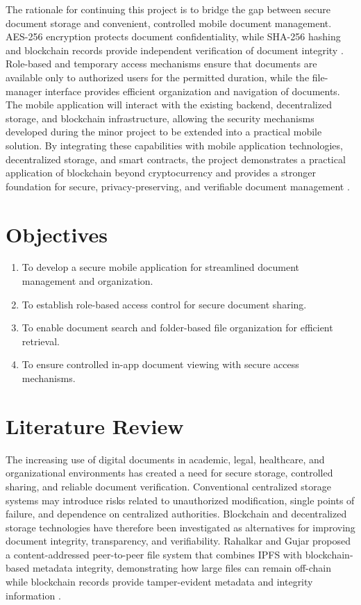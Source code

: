 \documentclass[12pt]{article}
\begin{document}
The rationale for continuing this project is to bridge the gap between secure document storage and convenient, controlled mobile document management. AES-256 encryption protects document confidentiality, while SHA-256 hashing and blockchain records provide independent verification of document integrity \cite{nist197}. Role-based and temporary access mechanisms ensure that documents are available only to authorized users for the permitted duration, while the file-manager interface provides efficient organization and navigation of documents. The mobile application will interact with the existing backend, decentralized storage, and blockchain infrastructure, allowing the security mechanisms developed during the minor project to be extended into a practical mobile solution. By integrating these capabilities with mobile application technologies, decentralized storage, and smart contracts, the project demonstrates a practical application of blockchain beyond cryptocurrency and provides a stronger foundation for secure, privacy-preserving, and verifiable document management \cite{szabo1997}.


\newpage
\section{Objectives}

\begin{enumerate}
    \item To develop a secure mobile application for streamlined document management and organization.
    
    \item To establish role-based access control for secure document sharing.
    
    \item To enable document search and folder-based file organization for efficient retrieval.
    
    \item To ensure controlled in-app document viewing with secure access mechanisms.
\end{enumerate}




\newpage
\section{Literature Review}

The increasing use of digital documents in academic, legal, healthcare, and organizational environments has created a need for secure storage, controlled sharing, and reliable document verification. Conventional centralized storage systems may introduce risks related to unauthorized modification, single points of failure, and dependence on centralized authorities. Blockchain and decentralized storage technologies have therefore been investigated as alternatives for improving document integrity, transparency, and verifiability. Rahalkar and Gujar proposed a content-addressed peer-to-peer file system that combines IPFS with blockchain-based metadata integrity, demonstrating how large files can remain off-chain while blockchain records provide tamper-evident metadata and integrity information \cite{rahalkar2019}.
\end{document}

